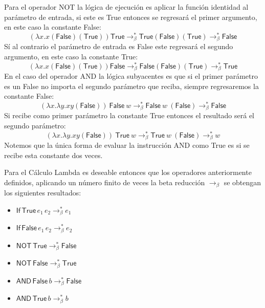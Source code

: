     Para el operador \textsf{NOT} la lógica de ejecución es aplicar la función identidad al parámetro de entrada, si este es \textsf{True} entonces se regresará el primer argumento, en este caso la constante \textsf{False}: \[ (\lambda x.x (\textsf{False})(\textsf{True}))\textsf{True} \to_\beta^* \textsf{True}(\textsf{False})(\textsf{True}) \to_\beta^* \textsf{False}\] 
	Sí al contrario el parámetro de entrada es \textsf{False} este regresará el segundo argumento, en este caso la constante \textsf{True}: \[ (\lambda x.x (\textsf{False})(\textsf{True}))\textsf{False} \to_\beta^* \textsf{False}(\textsf{False})(\textsf{True}) \to_\beta^* \textsf{True}\]
    En el caso del operador \textsf{AND} la lógica subyacentes es que si el primer parámetro es un \textsf{False} no importa el segundo parámetro que reciba, siempre regresaremos la constante \textsf{False}:
\[ (\lambda x.\lambda y. xy (\textsf{False}))\ \textsf{False}\  w \to_\beta^* \textsf{False}\ w\ (\textsf{False}) \to_\beta^* \textsf{False}  \]
Si recibe como primer parámetro la constante \textsf{True} entonces el resultado será el segundo parámetro:
\[ (\lambda x.\lambda y. xy (\textsf{False}))\ \textsf{True}\  w \to_\beta^* \textsf{True}\ w\ (\textsf{False}) \to_\beta^* w  \]
Notemos que la única forma de evaluar la instrucción \textsf{AND} como \textsf{True} es si se recibe esta constante dos veces.

Para el Cálculo Lambda es deseable entonces que los operadores anteriormente definidos, aplicando un número finito de veces la beta reducción $\to_\beta$ se obtengan los siguientes resultados:
   \begin{center}

        \begin{itemize} \centering
            \item $\mathsf{If}\,\textsf{True}\,e_1\,e_2 \to_\beta^* e_1$ 
            \item $\mathsf{If}\,\textsf{False}\,e_1\,e_2 \to_\beta^* e_2$ 
            \item $\mathsf{NOT}\,\textsf{True}\to_\beta^* \textsf{False}$
            \item $\mathsf{NOT}\,\textsf{False}\to_\beta^* \textsf{True}$
            \item $\mathsf{AND}\,\textsf{False}\,b\to_\beta^* \textsf{False}$
            \item $\mathsf{AND}\,\textsf{True}\,b\to_\beta^* b$
        \end{itemize}
   \end{center} 


